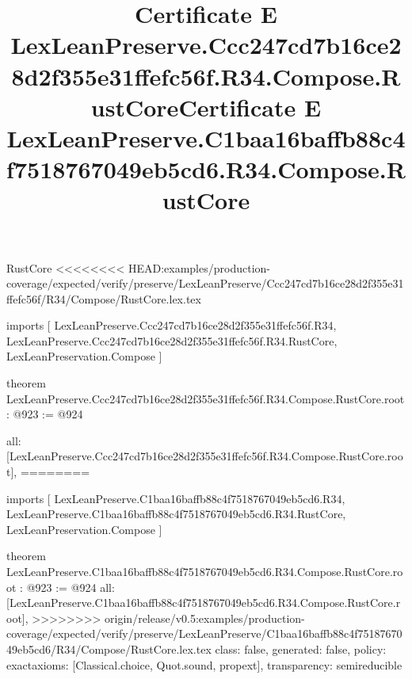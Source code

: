 \begin{lexlean}{RustCore}
<<<<<<<< HEAD:examples/production-coverage/expected/verify/preserve/LexLeanPreserve/Ccc247cd7b16ce28d2f355e31ffefc56f/R34/Compose/RustCore.lex.tex
\title{Certificate E LexLeanPreserve.Ccc247cd7b16ce28d2f355e31ffefc56f.R34.Compose.RustCore}
\begin{coremodule}
imports [
  LexLeanPreserve.Ccc247cd7b16ce28d2f355e31ffefc56f.R34,
  LexLeanPreserve.Ccc247cd7b16ce28d2f355e31ffefc56f.R34.RustCore,
  LexLeanPreservation.Compose
]

theorem LexLeanPreserve.Ccc247cd7b16ce28d2f355e31ffefc56f.R34.Compose.RustCore.root : @923 := @924 {
  all: [LexLeanPreserve.Ccc247cd7b16ce28d2f355e31ffefc56f.R34.Compose.RustCore.root],
========
\title{Certificate E LexLeanPreserve.C1baa16baffb88c4f7518767049eb5cd6.R34.Compose.RustCore}
\begin{coremodule}
imports [
  LexLeanPreserve.C1baa16baffb88c4f7518767049eb5cd6.R34,
  LexLeanPreserve.C1baa16baffb88c4f7518767049eb5cd6.R34.RustCore,
  LexLeanPreservation.Compose
]

theorem LexLeanPreserve.C1baa16baffb88c4f7518767049eb5cd6.R34.Compose.RustCore.root : @923 := @924 {
  all: [LexLeanPreserve.C1baa16baffb88c4f7518767049eb5cd6.R34.Compose.RustCore.root],
>>>>>>>> origin/release/v0.5:examples/production-coverage/expected/verify/preserve/LexLeanPreserve/C1baa16baffb88c4f7518767049eb5cd6/R34/Compose/RustCore.lex.tex
  class: false,
  generated: false,
  policy: exact{axioms: [Classical.choice, Quot.sound, propext]},
  transparency: semireducible
}


\end{coremodule}}
\end{coremodule}
\end{lexlean}
